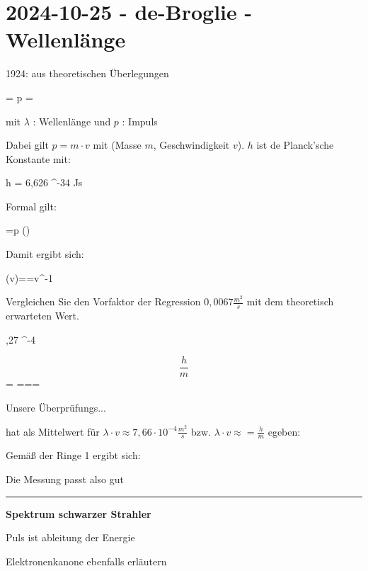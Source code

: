 \section{2024-10-25 - de-Broglie - Wellenlänge}

\startitemize[packed]
\item 1924: aus theoretischen Überlegungen
\stopitemize

\startformula
\lambda =  \leftrightarrow p = 
\stopformula

mit $\lambda$ : Wellenlänge und $p$ : Impuls

Dabei gilt $p=m \cdot v$ mit (Masse $m$, Geschwindigkeit $v$).
$h$ ist de Planck'sche Konstante mit:

\startformula
h = 6,626 ^{-34} Js
\stopformula

Formal gilt:

\startformula
{}=p \qquad ()
\stopformula

Damit ergibt sich:

\startformula
\lambda(v)==\cdot v^{-1}
\stopformula

\startframedtask
Vergleichen Sie den Vorfaktor der Regression $0,0067\frac{m^2}{s}$ mit dem theoretisch erwarteten Wert.
\stopframedtask

\startformula
{},27 ^{-4}
\stopformula

\startformula
\[\frac{h}{m}\] = ===
\stopformula

Unsere Überprüfungs...

hat als Mittelwert für $\lambda \cdot v \approx 7,66 \cdot 10^{-4}\frac{m^2}{s}$ bzw. $\lambda \cdot v \approx = \frac{h}{m}$ egeben:


Gemäß der Ringe 1 ergibt sich:



Die Messung passt also gut

\blank
\hrule
\blank

\startframedtipp
{\bf Spektrum schwarzer Strahler}
\stopframedtipp

\startframedtipp

Puls ist ableitung der Energie

\stopframedtipp

\startframedtipp
Elektronenkanone ebenfalls erläutern
\stopframedtipp

